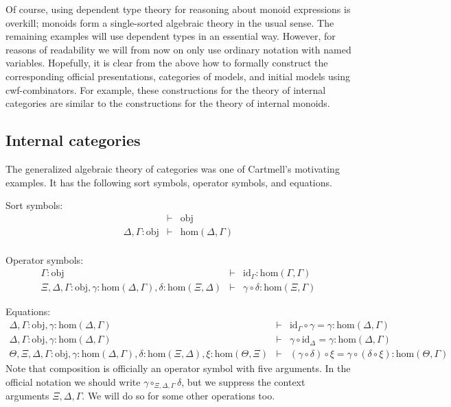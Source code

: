 \documentclass{mscs}
\newcommand{\FYI}[1]{{#1}}
\def\Obj{\mathrm{obj}}
\def\Ctx{\mathrm{Ctx}}
\def\Hom{\mathrm{hom}}
\def\id{\mathrm{id}}
\begin{document}
Of course, using dependent type theory for reasoning about monoid expressions is overkill; monoids form a single-sorted algebraic theory in the usual sense.
The remaining examples will use dependent types in an essential way. However, for reasons of readability we will from now on only use ordinary notation with named variables. Hopefully, it is clear from the above how to formally construct the corresponding official \FYI{presentations}, categories of models, and initial models using cwf-combinators. For example, these constructions for the theory of internal categories are similar to the constructions for the theory of internal monoids.


\subsection{Internal categories} The generalized algebraic theory of categories was one of Cartmell's motivating examples. It has the following sort symbols, operator symbols, and equations.

Sort symbols:
\begin{eqnarray*}
&\vdash& \Obj\\
\Delta, \Gamma : \Obj &\vdash& \Hom(\Delta,\Gamma)\\
\end{eqnarray*}

Operator symbols:
\begin{eqnarray*}
\Gamma : \Obj &\vdash& \id_\Gamma : \Hom(\Gamma,\Gamma)\\
\Xi,\Delta,\Gamma : \Obj, \gamma : \Hom(\Delta,\Gamma), \delta : \Hom(\Xi,\Delta) &\vdash&
\gamma \circ \delta : \Hom(\Xi,\Gamma)
\end{eqnarray*}

Equations:
\begin{eqnarray*}
\Delta, \Gamma : \Obj, \gamma : \Hom(\Delta,\Gamma) &\vdash& \id_\Gamma \circ \gamma = \gamma : \Hom(\Delta,\Gamma)\\
\Delta, \Gamma : \Obj, \gamma : \Hom(\Delta,\Gamma) &\vdash& \gamma \circ \id_\Delta = \gamma : \Hom(\Delta,\Gamma)\\
\Theta, \Xi,\Delta,\Gamma : \Obj, \gamma : \Hom(\Delta,\Gamma), \delta : \Hom(\Xi,\Delta), \xi : \Hom(\Theta,\Xi) &\vdash&
(\gamma \circ \delta) \circ \xi = \gamma \circ (\delta \circ \xi): \Hom(\Theta,\Gamma)
\end{eqnarray*}
Note that composition is officially an operator symbol with five arguments. In the official notation we should write $\gamma \circ_{\Xi,\Delta,\Gamma} \delta$, but we suppress the context arguments $\Xi,\Delta,\Gamma$. We will do so for some other operations too.
\end{document}
